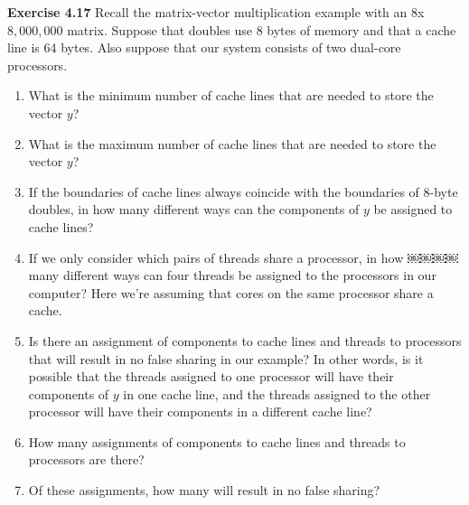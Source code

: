 \documentclass[12pt]{article}
\begin{document}
\pagebreak

\textbf{Exercise 4.17} Recall the matrix-vector multiplication example with an $8$x$8,000,000$ matrix. Suppose that doubles use 8 bytes of memory and that a cache line is 64 bytes. Also suppose that our system consists of two dual-core processors.
\begin{enumerate}[label=\alph*.]
    \item What is the minimum number of cache lines that are needed to store the vector $y$?
    \item What is the maximum number of cache lines that are needed to store the vector $y$?
    \item If the boundaries of cache lines always coincide with the boundaries of 8-byte doubles, in how many different ways can the components of $y$ be assigned to cache lines?
    \item If we only consider which pairs of threads share a processor, in how ￼￼￼￼many different ways can four threads be assigned to the processors in our computer? Here we're assuming that cores on the same processor share a cache.
    \item Is there an assignment of components to cache lines and threads to processors that will result in no false sharing in our example? In other words, is it possible that the threads assigned to one processor will have their components of $y$ in one cache line, and the threads assigned to the other processor will have their components in a different cache line?
    \item How many assignments of components to cache lines and threads to processors are there?
    \item Of these assignments, how many will result in no false sharing?
\end{enumerate}
\end{document}
